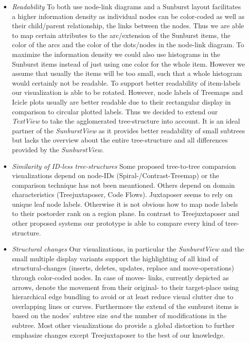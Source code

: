\begin{itemize}
\item \emph{Readability} To both use node-link diagrams and a Sunburst layout facilitates a higher information density as individual nodes can be color-coded as well as their child/parent relationship, the links between the nodes. Thus we are able to map certain attributes to the arc/extension of the Sunburst items, the color of the arcs and the color of the dots/nodes in the node-link diagram. To maximize the information density we could also use histograms in the Sunburst items instead of just using one color for the whole item. However we assume that usually the items will be too small, such that a whole histogram would certainly not be readable. To support better readability of item-labels our visualization is able to be rotated. However, node labels of Treemaps and Icicle plots usually are better readable due to their rectangular display in comparison to circular plotted labels. Thus we decided to extend our \emph{TextView} to take the agglomerated tree-structure into account. It is an ideal partner of the \emph{SunburstView} as it provides better readability of small subtrees but lacks the overview about the entire tree-structure and all differences provided by the \emph{SunburstView}. 
\item \emph{Similarity of ID-less tree-structures} Some proposed tree-to-tree comparsion visualizations depend on node-IDs (Spiral-/Contrast-Treemap\cite{tu2007visualizing}) or the comparison technique has not been meantioned. Others depend on domain characteristics (Treejuxtaposer\cite{munzner2003treejuxtaposer}, Code Flows\cite{telea2008code}). Juxtaposer seems to rely on unique leaf node labels. Otherwise it is not obvious how to map node labels to their postorder rank on a region plane. In contrast to Treejuxtaposer and other proposed systems our prototype is able to compare every kind of tree-structure.
\item \emph{Structural changes} Our visualizations, in particular the \emph{SunburstView} and the small multiple display variants support the highlighting of all kind of structural-changes (inserts, deletes, updates, replace and move-operations) through color-coded nodes. In case of moves- links, currently depicted as arrows, denote the movement from their original- to their target-place using hierarchical edge bundling to avoid or at least reduce visual clutter due to overlapping lines or curves. Furthermore the extend of the sunburst items is based on the nodes' subtree size \emph{and} the number of modifications in the subtree. Most other visualizations do provide a global distortion to further emphasize changes except Treejuxtaposer to the best of our knowledge.

\end{itemize}
